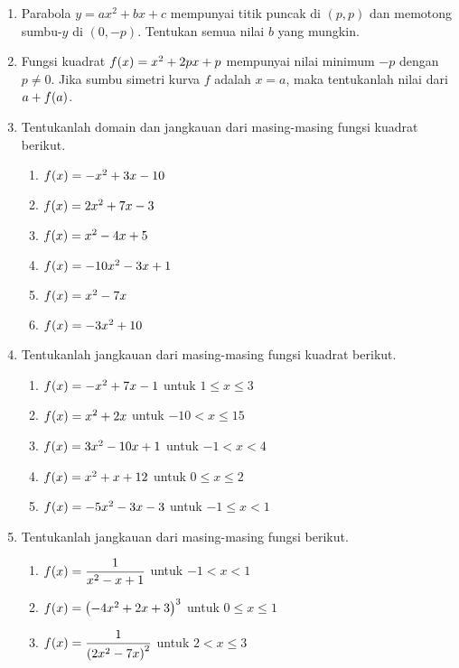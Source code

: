 \begin{enumerate}[topsep=0pt]
			\item Parabola $ y = ax^{2} + bx + c $ mempunyai titik puncak di $ \left(p, p\right) $ dan memotong sumbu-$ y $ di $ \left(0, -p\right) $. Tentukan semua nilai $ b $ yang mungkin.
			\item Fungsi kuadrat $ \mathop{}\!{f}{\left({x}\right)} = x^{2} + 2px + p $ mempunyai nilai minimum $ -p $ dengan $ p \ne 0 $. Jika sumbu simetri kurva $ f $ adalah $ x = a $, maka tentukanlah nilai dari $ a + \mathop{}\!{f}{\left({a}\right)} $.
			\item Tentukanlah domain dan jangkauan dari masing-masing fungsi kuadrat berikut.
			\begin{multcols}
				\begin{enumerate}
					\item $ \mathop{}\!{f}{\left({x}\right)} = -x^{2} + 3x - 10 $
					\item $ \mathop{}\!{f}{\left({x}\right)} = 2x^{2} + 7x - 3 $
					\item $ \mathop{}\!{f}{\left({x}\right)} = x^{2} - 4x + 5 $
					\item $ \mathop{}\!{f}{\left({x}\right)} = -10x^{2} - 3x + 1 $
					\item $ \mathop{}\!{f}{\left({x}\right)} = x^{2} - 7x $
					\item $ \mathop{}\!{f}{\left({x}\right)} = -3x^{2} + 10 $
				\end{enumerate}
			\end{multcols}
			\item Tentukanlah jangkauan dari masing-masing fungsi kuadrat berikut.
			\begin{enumerate}
				\item $ \mathop{}\!{f}{\left({x}\right)} = -x^{2} + 7x - 1 $ untuk $ 1 \leq x \leq 3 $
				\item $ \mathop{}\!{f}{\left({x}\right)} = x^{2} + 2x $ untuk $ -10 < x \leq 15 $
				\item $ \mathop{}\!{f}{\left({x}\right)} = 3x^{2} - 10x + 1 $ untuk $ -1 < x < 4 $
				\item $ \mathop{}\!{f}{\left({x}\right)} = x^{2} + x + 12 $ untuk $ 0 \leq x \leq 2 $
				\item $ \mathop{}\!{f}{\left({x}\right)} = -5x^{2} - 3x - 3 $ untuk $ -1 \leq x < 1 $
			\end{enumerate}
			\item Tentukanlah jangkauan dari masing-masing fungsi berikut.
			\begin{enumerate}
				\item $ \mathop{}\!{f}{\left({x}\right)} = \dfrac{1}{x^{2} - x + 1} $ untuk $ -1 < x < 1 $
				\item $ \mathop{}\!{f}{\left({x}\right)} = \left(-4x^{2} + 2x + 3\right)^{3} $ untuk $ 0 \leq x \leq 1 $
				\item $ \mathop{}\!{f}{\left({x}\right)} = \dfrac{1}{\left(2x^{2} - 7x\right)^{2}} $ untuk $ 2 < x \leq 3 $

\end{enumerate}
\end{enumerate}

